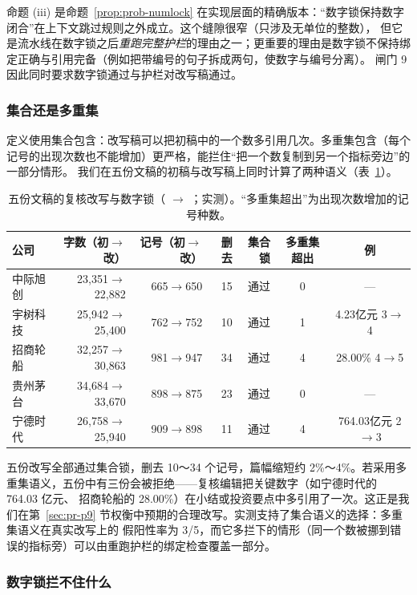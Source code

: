 命题 (iii) 是命题~\ref{prop:prob-numlock} 在实现层面的精确版本：“数字锁保持数字闭合”在上下文跳过规则之外成立。这个缝隙很窄（只涉及无单位的整数），
但它是流水线在数字锁之后\emph{重跑完整护栏}的理由之一；更重要的理由是数字锁不保持绑定正确与引用完备（例如把带编号的句子拆成两句，使数字与编号分离）。
闸门 9 因此同时要求数字锁通过与护栏对改写稿通过。

\subsubsection{集合还是多重集}

定义使用集合包含：改写稿可以把初稿中的一个数多引用几次。多重集包含（每个记号的出现次数也不能增加）更严格，能拦住“把一个数复制到另一个指标旁边”的一部分情形。
我们在五份文稿的初稿与改写稿上同时计算了两种语义（表~\ref{tab:guards-numlock}）。

\begin{table}[t]
\centering
\caption{五份文稿的复核改写与数字锁（ $\to$ ；实测）。“多重集超出”为出现次数增加的记号种数。}
\label{tab:guards-numlock}
\small
\begin{tabular}{@{}lrrrrcc@{}}
\toprule
公司 & 字数（初$\to$改） & 记号（初$\to$改） & 删去 & 集合锁 & 多重集超出 & 例 \\
\midrule
中际旭创 & 23,351$\to$22,882 & 665$\to$650 & 15 & 通过 & 0 & — \\
宇树科技 & 25,942$\to$25,400 & 762$\to$752 & 10 & 通过 & 1 & 4.23亿元 3$\to$4 \\
招商轮船 & 32,257$\to$30,863 & 981$\to$947 & 34 & 通过 & 4 & 28.00\% 4$\to$5 \\
贵州茅台 & 34,684$\to$33,670 & 898$\to$875 & 23 & 通过 & 0 & — \\
宁德时代 & 26,758$\to$25,940 & 909$\to$898 & 11 & 通过 & 4 & 764.03亿元 2$\to$3 \\
\bottomrule
\end{tabular}
\end{table}

五份改写全部通过集合锁，删去 10～34 个记号，篇幅缩短约 2\%～4\%。若采用多重集语义，五份中有三份会被拒绝——复核编辑把关键数字（如宁德时代的 764.03 亿元、
招商轮船的 28.00\%）在小结或投资要点中多引用了一次。这正是我们在第~\ref{sec:pr-p9} 节权衡中预期的合理改写。实测支持了集合语义的选择：多重集语义在真实改写上的
假阳性率为 3/5，而它多拦下的情形（同一个数被挪到错误的指标旁）可以由重跑护栏的绑定检查覆盖一部分。

\subsubsection{数字锁拦不住什么}

